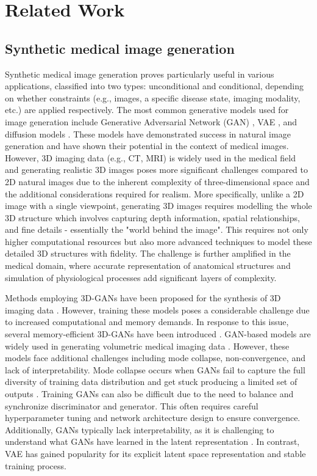 \section{Related Work}
\subsection{Synthetic medical image generation}
Synthetic medical image generation proves particularly useful in various applications, classified into two types: unconditional and conditional, depending on whether constraints (e.g., images, a specific disease state, imaging modality, etc.) are applied respectively. The most common generative models used for image generation include Generative Adversarial Network (GAN) \cite{creswell2018generative}, VAE \cite{kingma2013auto}, and diffusion models \cite{ho2020denoising}. These models have demonstrated success in natural image generation and have shown their potential in the context of medical images. However, 3D imaging data (e.g., CT, MRI) is widely used in the medical field and generating realistic 3D images poses more significant challenges compared to 2D natural images due to the inherent complexity of three-dimensional space and the additional considerations required for realism. More specifically, unlike a 2D image with a single viewpoint, generating 3D images requires modelling the whole 3D structure which involves capturing depth information, spatial relationships, and fine details - essentially the "world behind the image". This requires not only higher computational resources but also more advanced techniques to model these detailed 3D structures with fidelity. The challenge is further amplified in the medical domain, where accurate representation of anatomical structures and simulation of physiological processes add significant layers of complexity.

Methods employing 3D-GANs have been proposed for the synthesis of 3D imaging data \cite{ferreira2022gan,singh2021medical}. However, training these models poses a considerable challenge due to increased computational and memory demands. In response to this issue, several memory-efficient 3D-GANs have been introduced \cite{sun2022hierarchical,uzunova2019multi}. GAN-based models are widely used in generating volumetric medical imaging data \cite{ferreira2024gan}. However, these models face additional challenges including mode collapse, non-convergence, and lack of interpretability. Mode collapse occurs when GANs fail to capture the full diversity of training data distribution and get stuck producing a limited set of outputs \cite{bau2019seeing}. Training GANs can also be difficult due to the need to balance and synchronize discriminator and generator. This often requires careful hyperparameter tuning and network architecture design to ensure convergence. Additionally, GANs typically lack interpretability, as it is challenging to understand what GANs have learned in the latent representation \cite{shen2020interfacegan}. In contrast, VAE \cite{kingma2013auto} has gained popularity for its explicit latent space representation and stable training process.

